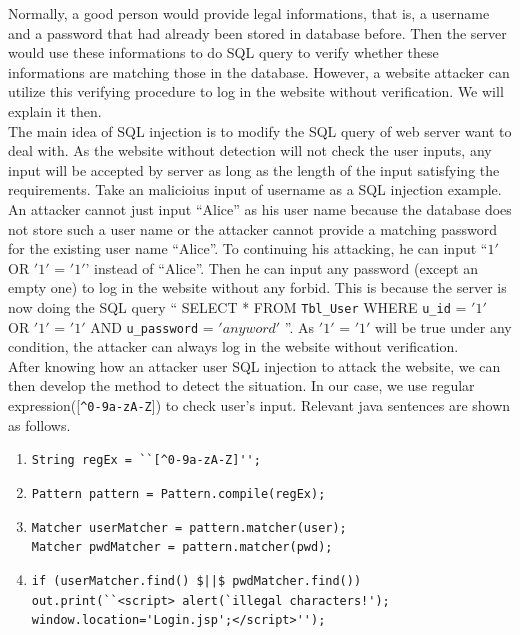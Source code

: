 \documentclass[12pt]{article}
\begin{document}
Normally, a good person would provide legal informations, that is, a username and a password that had already been stored in database before. Then the server would use these informations to do SQL query to verify whether these informations are matching those in the database. However, a website attacker can utilize this verifying procedure to log in the website without verification. We will explain it then.\\

The main idea of SQL injection is to modify the SQL query of web server want to deal with. As the website without detection will not check the user inputs, any input will be accepted by server as long as the length of the input satisfying the requirements. Take an malicioius input of username as a SQL injection example. An attacker cannot just input ``Alice'' as his user name because the database does not store such a user name or the attacker cannot provide a matching password for the existing user name ``Alice''. To continuing his attacking, he can input ``\(1'\) OR \('1'\) = \('1'\)' instead of ``Alice''. Then he can input any password (except an empty one) to log in the website without any forbid. This is because the server is now doing the SQL query `` SELECT * FROM \verb"Tbl_User" WHERE \verb"u_id" = \('1'\) OR \('1'\) = \('1'\) AND \verb"u_password" = \('anyword'\) ''. As \('1'\) = \('1'\) will be true under any condition, the attacker can always log in the website without verification.\\

After knowing how an attacker user SQL injection to attack the website, we can then develop the method to detect the situation. In our case, we use regular expression([\verb"^0-9a-zA-Z"]) to check user's input. Relevant java sentences are shown as follows.\\

\begin{enumerate}
\item \verb"String regEx = ``[^0-9a-zA-Z]'';"
\item \verb"Pattern pattern = Pattern.compile(regEx);"
\item \verb"Matcher userMatcher = pattern.matcher(user);"\\ 
      \verb"Matcher pwdMatcher = pattern.matcher(pwd);"
\item \verb"if (userMatcher.find() $||$ pwdMatcher.find())"\\
      \verb"out.print(``<script> alert(`illegal characters!');"\\
      \verb"window.location='Login.jsp';</script>'');"
\end{enumerate} 
\end{document}
